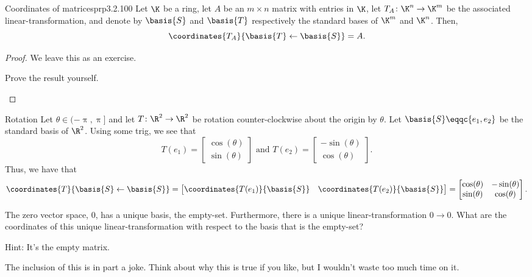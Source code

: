 \begin{prp}{Coordinates of matrices}{prp3.2.100}
	Let $\K$ be a ring, let $A$ be an $m\times n$ matrix with entries in $\K$, let $T_A\colon \K ^n\rightarrow \K ^m$ be the associated linear-transformation, and denote by $\basis{S}$ and $\basis{T}$ respectively the standard bases of $\K ^m$ and $\K ^n$.  Then,
	\begin{equation}
		\coordinates{T_A}{\basis{T}\leftarrow \basis{S}}=A.
	\end{equation}
	\begin{proof}
		We leave this as an exercise.
		\begin{exr}[breakable=false]{}{}
			Prove the result yourself.
		\end{exr}
	\end{proof}
\end{prp}
\begin{exm}{Rotation}{}
	Let $\theta \in (-\uppi ,\uppi ]$ and let $T\colon \R ^2\rightarrow \R ^2$ be rotation counter-clockwise about the origin by $\theta$.  Let $\basis{S}\eqqc \{ e_1,e_2\}$ be the standard basis of $\R ^2$.  Using some trig, we see that
	\begin{equation}
		T(e_1)=\begin{bmatrix}\cos (\theta ) \\ \sin (\theta )\end{bmatrix}\text{ and }T(e_2)=\begin{bmatrix}-\sin (\theta ) \\ \cos (\theta )\end{bmatrix}.
	\end{equation}
	Thus, we have that
	\begin{equation}
		\coordinates{T}{\basis{S}\leftarrow \basis{S}}=\begin{bmatrix}\coordinates{T(e_1)}{\basis{S}} & \coordinates{T(e_2)}{\basis{S}}\end{bmatrix}=\begin{bmatrix}\cos (\theta ) & -\sin (\theta ) \\ \sin (\theta ) & \cos (\theta )\end{bmatrix}.
	\end{equation}
\end{exm}
\begin{exr}{}{}
	The zero vector space, $0$, has a unique basis, the empty-set.  Furthermore, there is a unique linear-transformation $0\rightarrow 0$.  What are the coordinates of this unique linear-transformation with respect to the basis that is the empty-set?
	\begin{rmk}
		Hint:  It's the empty matrix.
	\end{rmk}
	\begin{rmk}
		The inclusion of this is in part a joke.  Think about why this is true if you like, but I wouldn't waste too much time on it.
	\end{rmk}
\end{exr}
